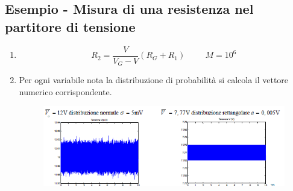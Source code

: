 \documentclass[a4paper, 15pt]{article}
\begin{document}
\subsection{Esempio - Misura di una resistenza nel partitore di tensione}
\begin{adjustwidth}{2in}{}    		
   		\begin{enumerate}
   			\item \[R_2 = \dfrac{V}{V_G-V}(R_G+R_1)\hspace{1cm} M=10^6\]
   			\item Per ogni variabile nota la distribuzione di probabilità si calcola il vettore
   			numerico corrispondente.  			
   			\begin{figure}[H]
   				\centering
   				\label{fig:screenshot006}
   				\includegraphics[width=0.5\linewidth]{fig/screenshot006}
   			\end{figure}
   			

\end{enumerate}
\end{adjustwidth}
\end{document}
